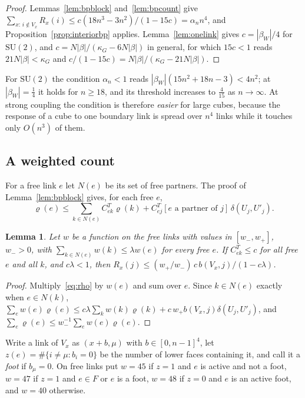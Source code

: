 \documentclass[11pt]{amsart}
\newtheorem{lemma}[theorem]{Lemma}
\theoremstyle{definition}
\theoremstyle{remark}
\numberwithin{equation}{section}
\newcommand{\SU}{\mathrm{SU}}
\begin{document}
\begin{proof}
Lemmas~\ref{lem:bpblock} and~\ref{lem:bpcount} give $\sum_{x:\,i\notin V_x}
R_x(i)\le c(18n^3-3n^2)/(1-15c)=\alpha_nn^4$, and
Proposition~\ref{prop:interiorbp} applies. Lemma~\ref{lem:onelink} gives
$c=|\beta_W|/4$ for $\SU(2)$, and $c=N|\beta|/(\kappa_G-6N|\beta|)$ in
general, for which $15c<1$ reads $21N|\beta|<\kappa_G$ and $c/(1-15c)=
N|\beta|/(\kappa_G-21N|\beta|)$.
\end{proof}

For $\SU(2)$ the condition $\alpha_n<1$ reads $|\beta_W|(15n^2+18n-3)<4n^2$; at
$|\beta_W|=\frac14$ it holds for $n\ge18$, and its threshold increases to
$\frac4{15}$ as $n\to\infty$. At strong coupling the condition is therefore
\emph{easier} for large cubes, because the response of a cube to one boundary
link is spread over $n^4$ links while it touches only $O(n^3)$ of them.

\subsection*{A weighted count}
For a free link $e$ let $N(e)$ be its set of free partners. The proof of
Lemma~\ref{lem:bpblock} gives, for each free $e$,
\begin{equation}\label{eq:rho}
\varrho(e)\le\sum_{k\in N(e)}C^T_{ek}\varrho(k)+C^T_{ej}[e\text{ a partner of }j]
\,\delta(U_j,U'_j).
\end{equation}

\begin{lemma}\label{lem:weightedresp}
Let $w$ be a function on the free links with values in $[w_-,w_+]$, $w_->0$,
with $\sum_{k\in N(e)}w(k)\le\lambda w(e)$ for every free $e$. If $C^T_{ek}\le
c$ for all free $e$ and all $k$, and $c\lambda<1$, then
$R_x(j)\le(w_+/w_-)\,c\,b(V_x,j)/(1-c\lambda)$.
\end{lemma}

\begin{proof}
Multiply~\eqref{eq:rho} by $w(e)$ and sum over $e$. Since $k\in N(e)$ exactly
when $e\in N(k)$, $\sum_ew(e)\varrho(e)\le c\lambda\sum_kw(k)\varrho(k)+
c\,w_+b(V_x,j)\delta(U_j,U'_j)$, and $\sum_e\varrho(e)\le w_-^{-1}\sum_ew(e)
\varrho(e)$.
\end{proof}

Write a link of $V_x$ as $(x+b,\mu)$ with $b\in[0,n-1]^4$, let
$z(e)=\#\{i\ne\mu:b_i=0\}$ be the number of lower faces containing it, and
call it a \emph{foot} if $b_\mu=0$. On free links put $w=45$ if $z=1$ and $e$
is active and not a foot, $w=47$ if $z=1$ and $e\in F$ or $e$ is a foot,
$w=48$ if $z=0$ and $e$ is an active foot, and $w=40$ otherwise.
\end{document}
